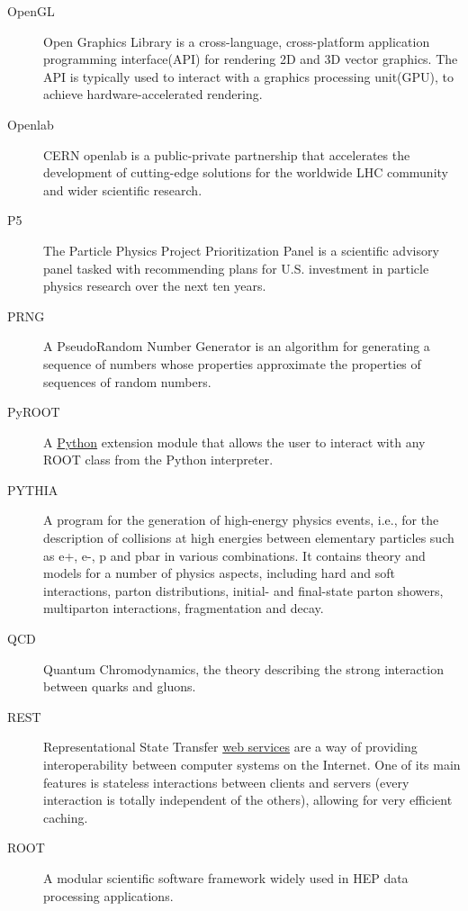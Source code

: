 \documentclass[12pt,a4paper]{article}
\begin{document}
\begin{appendices}
\begin{description}
\item[OpenGL] Open Graphics Library is a cross-language, cross-platform
application programming interface(API) for rendering 2D and 3D vector
graphics. The API is typically used to interact with a graphics
processing unit(GPU), to achieve hardware-accelerated rendering.

\item[Openlab] CERN openlab is a public-private partnership that accelerates
the development of cutting-edge solutions for the worldwide LHC
community and wider scientific research.

\item[P5] The Particle Physics Project Prioritization Panel is a scientific
advisory panel tasked with recommending plans for U.S. investment in
particle physics research over the next ten years.

\item[PRNG] A PseudoRandom Number Generator is an algorithm for generating a
sequence of numbers whose properties approximate the properties of
sequences of random numbers.

\item[PyROOT] A \href{http://www.python.org/}{Python} extension module that
allows the user to interact with any ROOT class from the Python
interpreter.

\item[PYTHIA] A program for the generation of high-energy physics events, i.e.,
for the description of collisions at high energies between elementary
particles such as e+, e-, p and pbar in various combinations. It
contains theory and models for a number of physics aspects, including
hard and soft interactions, parton distributions, initial- and
final-state parton showers, multiparton interactions, fragmentation and
decay.

\item[QCD] Quantum Chromodynamics, the theory describing the strong
interaction between quarks and gluons.

\item[REST] Representational State Transfer
\href{https://en.wikipedia.org/wiki/Web_service}{web services} are a way
of providing interoperability between computer systems on the Internet.
One of its main features is stateless interactions between clients and
servers (every interaction is totally independent of the others),
allowing for very efficient caching.

\item[ROOT] A modular scientific software framework widely used in HEP data
processing applications.


\end{description}
\end{appendices}
\end{document}
